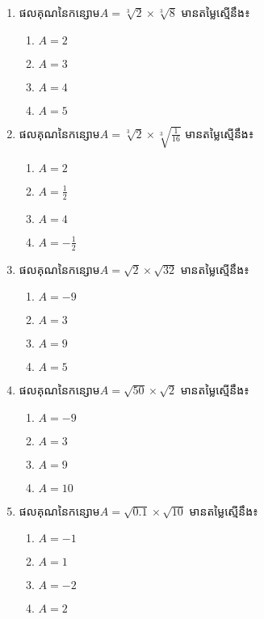 \begin{enumerate}
\item ផលគុណនៃកន្សោម$A=\sqrt[3]{2}\times \sqrt[3]{8}$  មានតម្លៃស្មើនឹង៖
\begin{multicols}{4}
\begin{enumerate}[label=\alph*.]
	\item $A=2$
	\item $A=3$
	\item $A=4$
	\item $A=5$
\end{enumerate}
\end{multicols}
\item ផលគុណនៃកន្សោម$A=\sqrt[3]{2}\times \sqrt[3]{\frac{1}{16}}$  មានតម្លៃស្មើនឹង៖
\begin{multicols}{4}
\begin{enumerate}[label=\alph*.]
	\item $A=2$
	\item $A=\frac{1}{2}$
	\item $A=4$
	\item $A=-\frac{1}{2}$
\end{enumerate}
\end{multicols}

\item ផលគុណនៃកន្សោម$A=\sqrt{2}\times \sqrt{32}$  មានតម្លៃស្មើនឹង៖
\begin{multicols}{4}
\begin{enumerate}[label=\alph*.]
	\item $A=-9$
	\item $A=3$
	\item $A=9$
	\item $A=5$
\end{enumerate}
\end{multicols}

\item ផលគុណនៃកន្សោម$A=\sqrt{50}\times \sqrt{2}$  មានតម្លៃស្មើនឹង៖
\begin{multicols}{4}
\begin{enumerate}[label=\alph*.]
	\item $A=-9$
	\item $A=3$
	\item $A=9$
	\item $A=10$
\end{enumerate}
\end{multicols}

\item ផលគុណនៃកន្សោម$A=\sqrt{0.1}\times \sqrt{10}$  មានតម្លៃស្មើនឹង៖
\begin{multicols}{4}
\begin{enumerate}[label=\alph*.]
	\item $A=-1$
	\item $A=1$
	\item $A=-2$
	\item $A=2$
\end{enumerate}
\end{multicols}


\end{enumerate}
